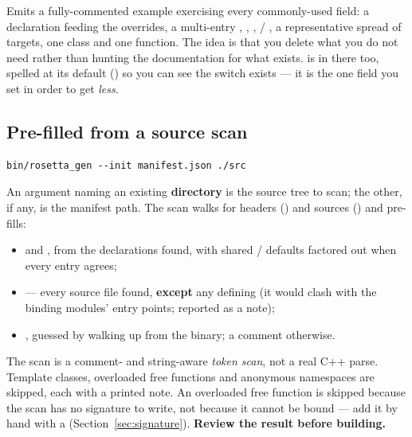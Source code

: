 Emits a fully-commented example exercising every commonly-used field: a
 declaration feeding the  overrides, a
multi-entry , ,
,  / , a
representative spread of targets, one class and one function. The idea is that
you delete what you do not need rather than hunting the documentation for what
exists.  is in there too, spelled at its default
() so you can see the switch exists --- it is the one field you set
in order to get \emph{less}.

\subsection*{Pre-filled from a source scan}

\begin{lstlisting}[style=sh]
bin/rosetta_gen --init manifest.json ./src
\end{lstlisting}

An argument naming an existing \textbf{directory} is the source tree to scan;
the other, if any, is the manifest path. The scan walks for headers
() and sources () and pre-fills:

\begin{itemize}
  \item {} and , from the declarations found, with
    shared  /  defaults factored out when
    every entry agrees;
  \item {} --- every source file found, \textbf{except} any
    defining  (it would clash with the binding modules' entry
    points; reported as a note);
  \item {}, guessed by walking up from the
     binary; a  comment otherwise.
\end{itemize}

\begin{warn}
The scan is a comment- and string-aware \emph{token scan}, not a real C++ parse.
Template classes, overloaded free functions and anonymous namespaces are
skipped, each with a printed note. An overloaded free function is skipped
because the scan has no signature to write, not because it cannot be bound ---
add it by hand with a  (Section~\ref{sec:signature}).
\textbf{Review the result before building.}
\end{warn}

